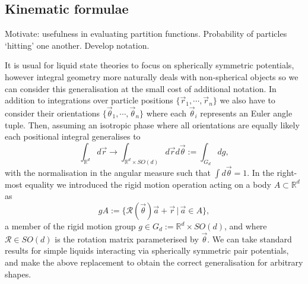 \subsection{Kinematic formulae}

Motivate: usefulness in evaluating partition functions.
Probability of particles `hitting' one another.
Develop notation.

It is usual for liquid state theories to focus on spherically symmetric potentials, however integral geometry more naturally deals with non-spherical objects so we can consider this generalisation at the small cost of additional notation.
In addition to integrations over particle positions $\{\vec{r}_1, \cdots, \vec{r}_n\}$ we also have to consider their orientations $\{\vec{\theta}_1, \cdots, \vec{\theta}_n\}$ where each $\vec{\theta}_i$ represents an Euler angle tuple.
Then, assuming an isotropic phase where all orientations are equally likely each positional integral generalises to
\begin{equation*}
  \int_{\mathbb{R}^d} d\vec{r}
  \to
  \int_{\mathbb{R}^d \times SO(d)} d\vec{r} d\vec{\theta}
  :=
  \int_{G_d} dg,
\end{equation*}
with the normalisation in the angular measure such that $\int d\vec{\theta} = 1$. In the right-most equality we introduced the rigid motion operation acting on a body $A \subset \mathbb{R}^d$ as
\begin{equation*}
  g A := \{\mathcal{R}(\vec{\theta}) \vec{a} + \vec{r} \, | \, \vec{a} \in A\},
\end{equation*}
a member of the rigid motion group $g \in G_d := \mathbb{R}^d \times SO(d)$, and where $\mathcal{R} \in SO(d)$ is the rotation matrix parameterised by $\vec{\theta}$.
We can take standard results for simple liquids interacting via spherically symmetric pair potentials, and make the above replacement to obtain the correct generalisation for arbitrary shapes.


